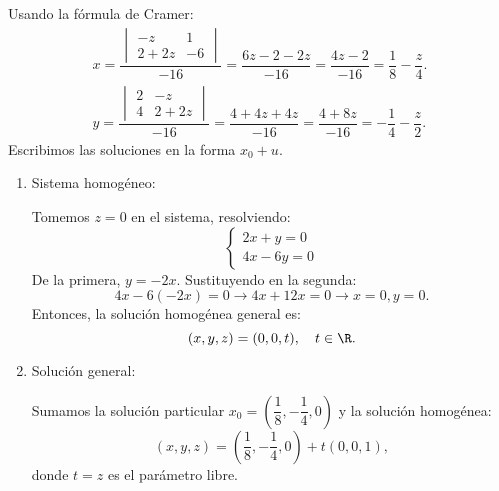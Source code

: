 \begin{enumerate}[label=\color{red}\textbf{\arabic*)}]
Usando la fórmula de Cramer:  \[
\begin{array}{c}
    x=\dfrac{\begin{vmatrix} 
            -z & 1\\
            2+2z & -6
    \end{vmatrix} }{-16}=\dfrac{6z-2-2z}{-16}=\dfrac{4z-2}{-16}=\dfrac{1}{8}-\dfrac{z}{4}.\\
    y=\dfrac{\begin{vmatrix} 
            2 & -z\\
            4 & 2+2z
    \end{vmatrix} }{-16}=\dfrac{4+4z+4z}{-16}=\dfrac{4+8z}{-16}=-\dfrac{1}{4}-\dfrac{z}{2}.
\end{array}
\] 
Escribimos las soluciones en la forma $ x_0+u$.
\begin{enumerate}[label=\arabic*)]
    \item Sistema homogéneo:

        Tomemos $z=0$ en el sistema, resolviendo: \[
        \begin{cases}
            2x+y=0\\
           4x-6y=0 
        \end{cases}
        \] 
        De la primera, $y=-2x$. Sustituyendo en la segunda:  \[
        4x-6(-2x)=0\longrightarrow 4x+12x=0\longrightarrow x=0,y=0.
        \] 
        Entonces, la solución homogénea general es: \[
            (x,y,z)=(0,0,t),\quad t\in \R.
        \] 
    \item Solución general:

        Sumamos la solución particular $x_0=\left( \dfrac{1}{8},-\dfrac{1}{4},0 \right) $ y la solución homogénea: \[
            (x,y,z)=\left( \dfrac{1}{8},-\dfrac{1}{4},0 \right) +t(0,0,1),
        \]
        donde $t=z$ es el parámetro libre.
\end{enumerate}
\end{enumerate}

